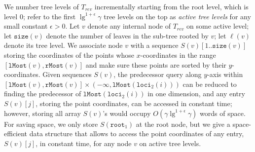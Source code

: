 \documentclass[smallabstract,smallcaptions]{dccpaper}
\def\idtt#1{\ensuremath{\mathtt{#1}}}
\def\partner{\idtt{partner}}
\def\loci{\idtt{loci}}
\def\lMost{\idtt{lMost}}
\def\rMost{\idtt{rMost}}
\def\size{\idtt{size}}
\def\root{\idtt{root}}
\begin{document}
We number tree levels of $T_{rev}$ incrementally starting from the root
level, which is level 0; refer to the first $\lg^{1+\epsilon} \gamma$ tree levels on the top as {\em active tree levels} for any small constant $\epsilon>0$.
Let $v$ denote any internal node of $T_{rev}$ on some active level;
let $\size(v)$ denote the number of leaves in the sub-tree rooted by $v$; let $\ell(v)$ denote its tree level.
We associate node $v$ with a sequence $S(v)[1..\size(v)]$ storing the coordinates of the points whose $x$-coordinates in the range $[\lMost(v), \rMost(v)]$ and make sure these points are sorted by their $y$-coordinates.
Given sequences $S(v)$, the predecessor query along $y$-axis within $[\lMost(v), \rMost(v)]\times(-\infty, \lMost(\loci_2(i)))$ can be reduced to finding the predecessor of $\lMost(\loci_2(i))$ in one dimension, and any entry $S(v)[j]$, storing the point coordinates, can be accessed in constant time; however, storing all array $S(v)$'s would occupy $O(\gamma \lg^{1+\epsilon} \gamma)$ words of space.
For saving space, we only store $S(\root_1)$ at the root node, but we give a space-efficient data structure that allows to access the point coordinates of any entry, $S(v)[j]$, in constant time, for any node $v$ on active tree levels.
\end{document}
